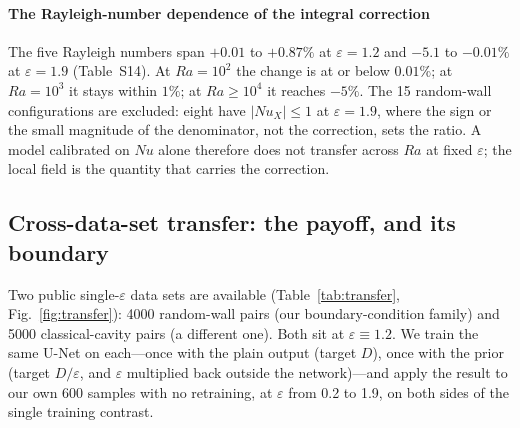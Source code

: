 \documentclass[preprint,11pt,a4paper,times,doubleblind]{elsarticle}
\begin{document}
\paragraph{The Rayleigh-number dependence of the integral correction} The five Rayleigh numbers
span $+0.01$ to $+0.87\%$ at $\varepsilon=1.2$ and $-5.1$ to $-0.01\%$ at $\varepsilon=1.9$
(Table~S14). At $Ra=10^2$ the change is at or below $0.01\%$; at $Ra=10^3$ it stays within $1\%$; at
$Ra\ge10^4$ it reaches $-5\%$. The 15 random-wall configurations are excluded:
eight have $|Nu_X|\le1$ at $\varepsilon=1.9$, where the sign or the small magnitude of the denominator, not the correction, sets the
ratio. A model calibrated on $Nu$ alone therefore does not transfer across $Ra$ at fixed
$\varepsilon$; the local field is the quantity that carries the correction.

\subsection{Cross-data-set transfer: the payoff, and its boundary}
\label{sec:transfer}

Two public single-$\varepsilon$ data sets are available (Table~\ref{tab:transfer},
Fig.~\ref{fig:transfer}): 4000 random-wall pairs (our
boundary-condition family) and 5000 classical-cavity pairs (a different one). Both sit at
$\varepsilon\equiv1.2$. We train the same U-Net on each---once with the plain output (target $D$),
once with the prior (target $D/\varepsilon$, and $\varepsilon$ multiplied back outside the
network)---and apply the result to our own 600 samples with no retraining, at
$\varepsilon$ from 0.2 to 1.9, on both sides of the single training contrast.
\end{document}
